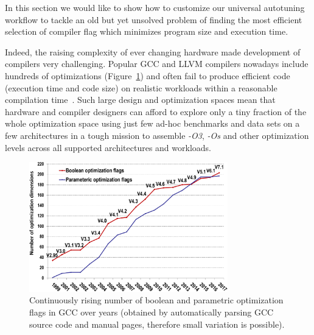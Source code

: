 In this section we would like to show how to 
customize our universal autotuning workflow
to tackle an old but yet unsolved problem 
of finding the most efficient 
selection of compiler flag which minimizes 
program size and execution time.

Indeed, the raising complexity of ever changing hardware 
made development of compilers very challenging.
%
Popular GCC and LLVM compilers nowadays include hundreds 
of optimizations (Figure~\ref{fig:rising-compiler-flags}) 
and often fail to produce efficient code (execution time and code size)
on realistic workloads within a reasonable compilation time~\cite{atlas, europar97x, citeulike:1671417,
Hall:2009:CRN:1461928.1461946, fursin:hal-01054763}.
%
Such large design and optimization spaces mean
that hardware and compiler designers can afford to explore
only a tiny fraction of the whole optimization space 
using just few ad-hoc benchmarks and data sets on a few architectures
in a tough mission to assemble \textit{-O3}, \textit{-Os} and other
optimization levels across all supported architectures and workloads.

   \begin{figure}[]
     \centering
      \includegraphics[width=3.4in]
      {ck-assets/aaf72841d69bde12-cropped.pdf} %
     \caption{
       Continuously rising number of boolean and parametric optimization flags 
       in GCC over years (obtained by automatically parsing GCC source code 
       and manual pages, therefore small variation is possible).
     }
     \label{fig:rising-compiler-flags}
   \end{figure}

